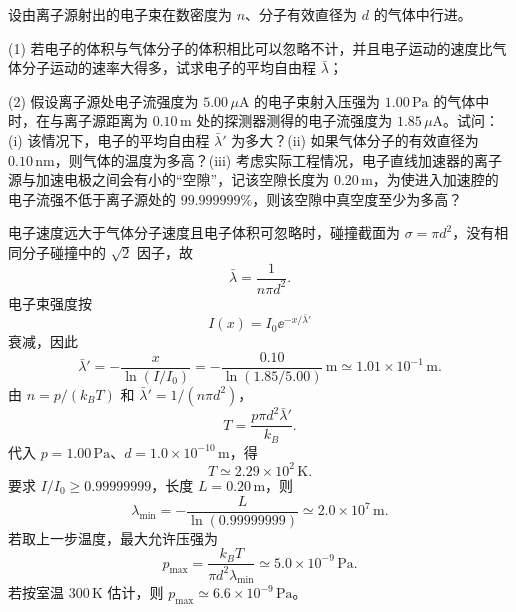 \begin{question}
设由离子源射出的电子束在数密度为 $n$、分子有效直径为 $d$ 的气体中行进。

(1) 若电子的体积与气体分子的体积相比可以忽略不计，并且电子运动的速度比气体分子运动的速率大得多，试求电子的平均自由程 $\bar\lambda$；

(2) 假设离子源处电子流强度为 $5.00\,\mu\mathrm A$ 的电子束射入压强为 $1.00\,\mathrm{Pa}$ 的气体中时，在与离子源距离为 $0.10\,\mathrm m$ 处的探测器测得的电子流强度为 $1.85\,\mu\mathrm A$。试问：(i) 该情况下，电子的平均自由程 $\bar\lambda'$ 为多大？(ii) 如果气体分子的有效直径为 $0.10\,\mathrm{nm}$，则气体的温度为多高？(iii) 考虑实际工程情况，电子直线加速器的离子源与加速电极之间会有小的“空隙”，记该空隙长度为 $0.20\,\mathrm m$，为使进入加速腔的电子流强不低于离子源处的 $99.999999\%$，则该空隙中真空度至少为多高？
\begin{solution}
电子速度远大于气体分子速度且电子体积可忽略时，碰撞截面为 $\sigma=\pi d^2$，没有相同分子碰撞中的 $\sqrt2$ 因子，故
\[
\bar\lambda=\frac1{n\pi d^2}.
\]
电子束强度按
\[
I(x)=I_0\ee^{-x/\bar\lambda'}
\]
衰减，因此
\[
\bar\lambda'=-\frac{x}{\ln(I/I_0)}
=-\frac{0.10}{\ln(1.85/5.00)}\,\mathrm m
\simeq 1.01\times10^{-1}\,\mathrm m.
\]
由 $n=p/(k_BT)$ 和 $\bar\lambda'=1/(n\pi d^2)$，
\[
T=\frac{p\pi d^2\bar\lambda'}{k_B}.
\]
代入 $p=1.00\,\mathrm{Pa}$、$d=1.0\times10^{-10}\,\mathrm m$，得
\[
T\simeq 2.29\times10^2\,\mathrm K.
\]
要求 $I/I_0\ge 0.99999999$，长度 $L=0.20\,\mathrm m$，则
\[
\lambda_{\min}=-\frac{L}{\ln(0.99999999)}\simeq2.0\times10^7\,\mathrm m.
\]
若取上一步温度，最大允许压强为
\[
p_{\max}=\frac{k_BT}{\pi d^2\lambda_{\min}}
\simeq5.0\times10^{-9}\,\mathrm{Pa}.
\]
若按室温 $300\,\mathrm K$ 估计，则 $p_{\max}\simeq6.6\times10^{-9}\,\mathrm{Pa}$。
\end{solution}
\end{question}

